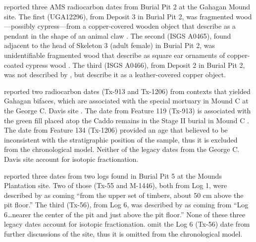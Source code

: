 \documentclass[review]{elsarticle}
\begin{document}
\citet[Table 1]{RN4783} reported three AMS radiocarbon dates from Burial Pit 2 at the Gahagan Mound site. The first (UGA12296), from Deposit 3 in Burial Pit 2, was fragmented wood—possibly cypress—from a copper-covered wooden object that \citet[99, Plate 29, No. 2, Object 5]{RN5274} describe as a pendant in the shape of an animal claw \citep{RN4783}. The second (ISGS A0465), found adjacent to the head of Skeleton 3 (adult female) in Burial Pit 2, was unidentifiable fragmented wood that \citet[96, Plate 21 and 28, Nos. 2-3]{RN5274} describe as square ear ornaments of copper-coated cypress wood \citep{RN4783}. The third (ISGS A0466), from Deposit 2 in Burial Pit 2, was not described by \citet[96]{RN5274}, but \citet[62]{RN4783} describe it as a leather-covered copper object.

\citet[Table 1]{RN3714} reported two radiocarbon dates (Tx-913 and Tx-1206) from contexts that yielded Gahagan bifaces, which are associated with the special mortuary in Mound C at the George C. Davis site \citep[Table 5]{RN3714}. The date from Feature 119 (Tx-913) is associated with the green fill placed atop the Caddo remains in the Stage II burial in Mound C \citep{RN3714}. The date from Feature 134 (Tx-1206) provided an age that \citet{RN3714} believed to be inconsistent with the stratigraphic position of the sample, thus it is excluded from the chronological model. Neither of the legacy dates from the George C. Davis site account for isotopic fractionation.

\citet[72]{RN11561} reported three dates from two logs found in Burial Pit 5 at the Mounds Plantation site. Two of those (Tx-55 and M-1446), both from Log 1, were described by \citet[72]{RN11561} as coming “from the upper set of timbers, about 50 cm above the pit floor.” The third (Tx-56), from Log 6, was described by \citet[72]{RN11561} as coming from “Log 6…nearer the center of the pit and just above the pit floor.” None of these three legacy dates account for isotopic fractionation. \citet{RN11561} omit the Log 6 (Tx-56) date from further discussions of the site, thus it is omitted from the chronological model.
\end{document}
